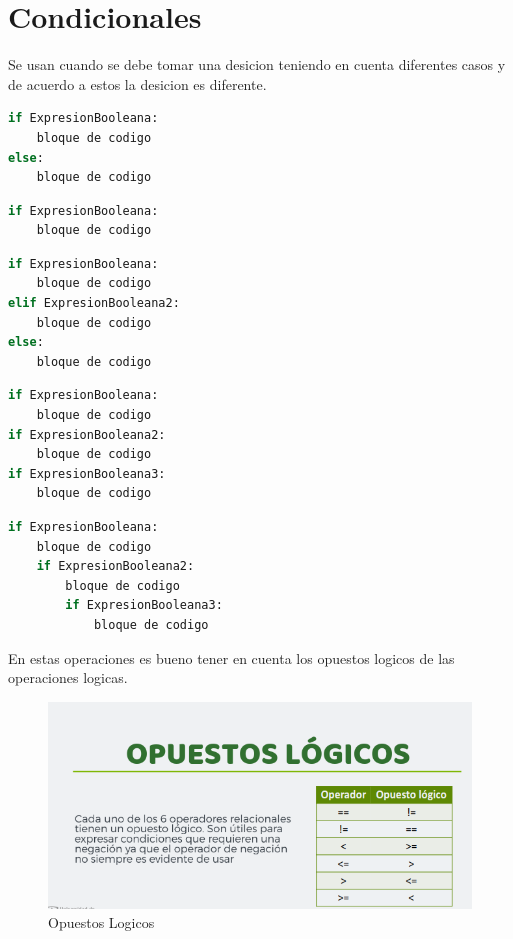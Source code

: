 \documentclass{article}
\begin{document}
\section{Condicionales}
Se usan cuando se debe tomar una desicion teniendo en cuenta diferentes casos y de acuerdo a estos la desicion es diferente.
\begin{lstlisting}[language=Python, caption=Operaciones If-else]
if ExpresionBooleana:
    bloque de codigo
else:
    bloque de codigo
\end{lstlisting}
\begin{lstlisting}[language=Python, caption=Operaciones If]
if ExpresionBooleana:
    bloque de codigo
\end{lstlisting}
\begin{lstlisting}[language=Python, caption=Operaciones If en casacada]
if ExpresionBooleana:
    bloque de codigo
elif ExpresionBooleana2:
    bloque de codigo
else:
    bloque de codigo
\end{lstlisting}
\begin{lstlisting}[language=Python, caption=Operaciones If en consecutivo]
if ExpresionBooleana:
    bloque de codigo
if ExpresionBooleana2:
    bloque de codigo
if ExpresionBooleana3:
    bloque de codigo
\end{lstlisting}
\begin{lstlisting}[language=Python, caption=Operaciones If en anidadas]
if ExpresionBooleana:
    bloque de codigo
    if ExpresionBooleana2:
        bloque de codigo
        if ExpresionBooleana3:
            bloque de codigo
\end{lstlisting}
En estas operaciones es bueno tener en cuenta los opuestos logicos de las operaciones logicas.
\begin{figure}[H]
    \centering
    \includegraphics[width=1\linewidth]{OpuestosLogicos.png}
    \caption{Opuestos Logicos}
    \label{fig:enter-label}
\end{figure}
\end{document}
